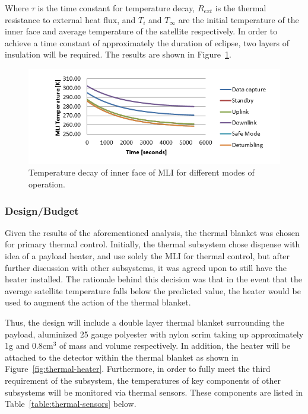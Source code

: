 \documentclass[12pt]{article}
\begin{document}
Where $\tau$ is the time constant for temperature decay, $R_{ext}$ is the thermal resistance to external heat flux, and $T_i$ and $T_\infty$ are the initial temperature of the inner face and average temperature of the satellite respectively. In order to achieve a time constant of approximately the duration of eclipse, two layers of insulation will be required. The results are shown in Figure~\ref{fig:thermal-decay}.

\begin{figure}[ht]%
\centering
\includegraphics{images/thermal-decay}%
\caption{Temperature decay of inner face of MLI for different modes of operation.}%
\label{fig:thermal-decay}%
\end{figure}

\subsubsection{Design/Budget}

Given the results of the aforementioned analysis, the thermal blanket was chosen for primary thermal control. Initially, the thermal subsystem chose dispense with idea of a payload heater, and use solely the MLI for thermal control, but after further discussion with other subsystems, it was agreed upon to still have the heater installed. The rationale behind this decision was that in the event that the average satellite temperature falls below the predicted value, the heater would be used to augment the action of the thermal blanket.
 
Thus, the design will include a double layer thermal blanket surrounding the payload, aluminized 25 gauge polyester with nylon scrim taking up approximately 1g and 0.8cm$^3$ of mass and volume respectively. In addition, the heater will be attached to the detector within the thermal blanket as shown in Figure~\ref{fig:thermal-heater}.  Furthermore, in order to fully meet the third requirement of the subsystem, the temperatures of key components of other subsystems will be monitored via thermal sensors.  These components are listed in Table~\ref{table:thermal-sensors} below.
\end{document}
